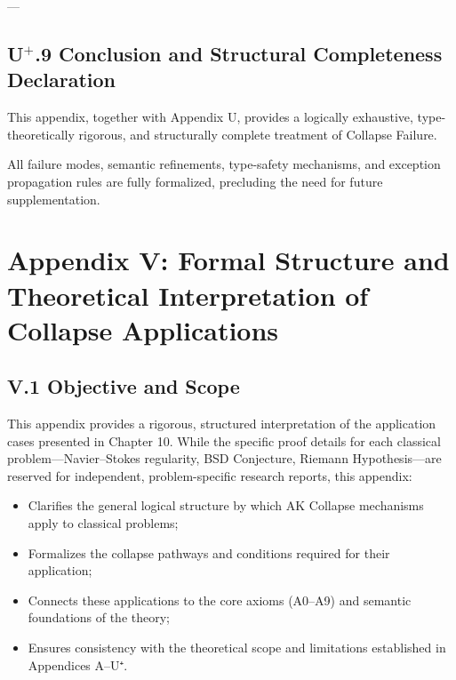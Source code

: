 \documentclass[11pt]{article}
\begin{document}
---

\subsection*{U$^{+}$.9 Conclusion and Structural Completeness Declaration}

This appendix, together with Appendix U, provides a logically exhaustive, type-theoretically rigorous, and structurally complete treatment of Collapse Failure.

All failure modes, semantic refinements, type-safety mechanisms, and exception propagation rules are fully formalized, precluding the need for future supplementation.




\section*{Appendix V: Formal Structure and Theoretical Interpretation of Collapse Applications}

\subsection*{V.1 Objective and Scope}

This appendix provides a rigorous, structured interpretation of the application cases presented in Chapter 10.  
While the specific proof details for each classical problem—Navier–Stokes regularity, BSD Conjecture, Riemann Hypothesis—are reserved for independent, problem-specific research reports, this appendix:

\begin{itemize}
    \item Clarifies the general logical structure by which AK Collapse mechanisms apply to classical problems;
    \item Formalizes the collapse pathways and conditions required for their application;
    \item Connects these applications to the core axioms (A0–A9) and semantic foundations of the theory;
    \item Ensures consistency with the theoretical scope and limitations established in Appendices A–U⁺.
\end{itemize}
\end{document}
